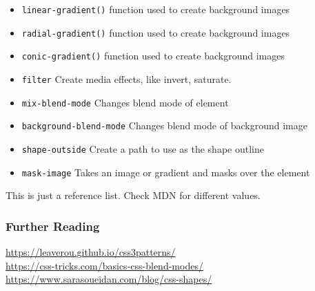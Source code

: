 \begin{itemize}
    \item \texttt{linear-gradient()} function used to create background images
    \item \texttt{radial-gradient()} function used to create background images
    \item \texttt{conic-gradient()} function used to create background images
    \item \texttt{filter} Create media effects, like invert, saturate.
    \item \texttt{mix-blend-mode} Changes blend mode of element
    \item \texttt{background-blend-mode} Changes blend mode of background image
    \item \texttt{shape-outside} Create a path to use as the shape outline
    \item \texttt{mask-image} Takes an image or gradient and masks over the element
\end{itemize}

This is just a reference list. Check MDN for different values.

\subsubsection{Further Reading}

\href{Patterns}{https://leaverou.github.io/css3patterns/}
\\
\href{Blend modes}{https://css-tricks.com/basics-css-blend-modes/}
\\
\href{Shapes}{https://www.sarasoueidan.com/blog/css-shapes/}
